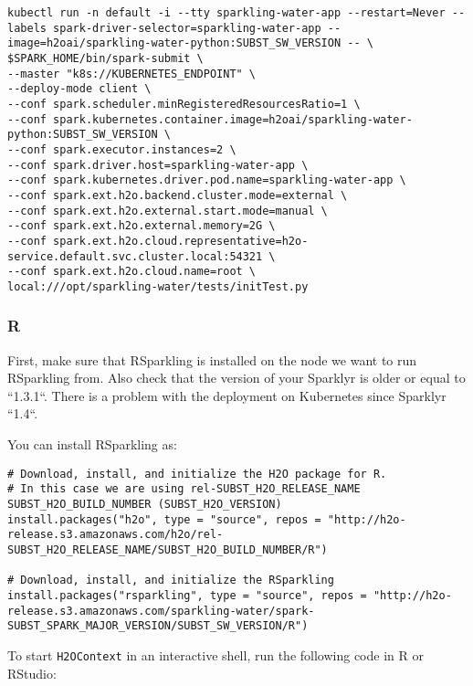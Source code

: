 \begin{lstlisting}[style=Bash]
kubectl run -n default -i --tty sparkling-water-app --restart=Never --labels spark-driver-selector=sparkling-water-app --image=h2oai/sparkling-water-python:SUBST_SW_VERSION -- \
$SPARK_HOME/bin/spark-submit \
--master "k8s://KUBERNETES_ENDPOINT" \
--deploy-mode client \
--conf spark.scheduler.minRegisteredResourcesRatio=1 \
--conf spark.kubernetes.container.image=h2oai/sparkling-water-python:SUBST_SW_VERSION \
--conf spark.executor.instances=2 \
--conf spark.driver.host=sparkling-water-app \
--conf spark.kubernetes.driver.pod.name=sparkling-water-app \
--conf spark.ext.h2o.backend.cluster.mode=external \
--conf spark.ext.h2o.external.start.mode=manual \
--conf spark.ext.h2o.external.memory=2G \
--conf spark.ext.h2o.cloud.representative=h2o-service.default.svc.cluster.local:54321 \
--conf spark.ext.h2o.cloud.name=root \
local:///opt/sparkling-water/tests/initTest.py
\end{lstlisting}

\subsubsection{R}

First, make sure that RSparkling is installed on the node we want to run RSparkling from. Also check that the version
of your Sparklyr is older or equal to ``1.3.1``. There is a problem with the deployment on Kubernetes since Sparklyr ``1.4``.

You can install RSparkling as:

\begin{lstlisting}[style=R]
# Download, install, and initialize the H2O package for R.
# In this case we are using rel-SUBST_H2O_RELEASE_NAME SUBST_H2O_BUILD_NUMBER (SUBST_H2O_VERSION)
install.packages("h2o", type = "source", repos = "http://h2o-release.s3.amazonaws.com/h2o/rel-SUBST_H2O_RELEASE_NAME/SUBST_H2O_BUILD_NUMBER/R")

# Download, install, and initialize the RSparkling
install.packages("rsparkling", type = "source", repos = "http://h2o-release.s3.amazonaws.com/sparkling-water/spark-SUBST_SPARK_MAJOR_VERSION/SUBST_SW_VERSION/R")
\end{lstlisting}

To start \texttt{H2OContext} in an interactive shell, run the following code in R or RStudio:

